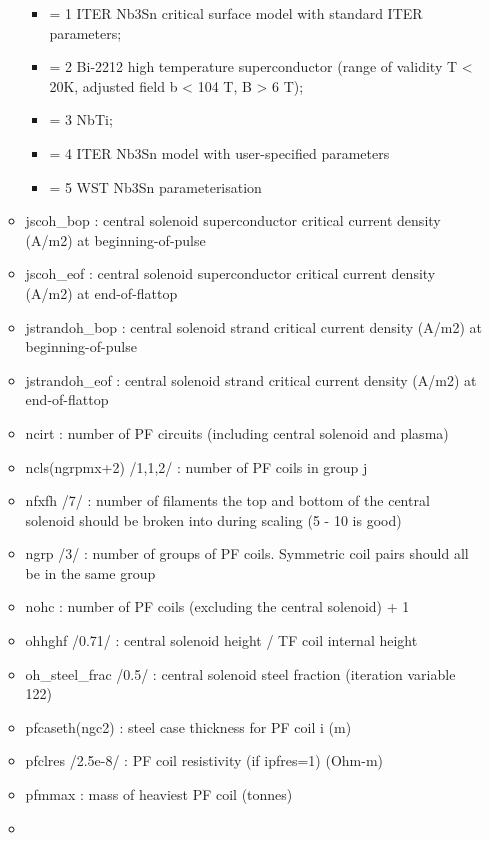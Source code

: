 \documentclass[
]{article}
\providecommand{\tightlist}{%
  \setlength{\itemsep}{0pt}\setlength{\parskip}{0pt}}
\begin{document}
\begin{itemize}
\begin{itemize}
    \begin{itemize}
    \tightlist
    \item
      = 1 ITER Nb3Sn critical surface model with standard ITER
      parameters;
    \item
      = 2 Bi-2212 high temperature superconductor (range of validity T
      \textless{} 20K, adjusted field b \textless{} 104 T, B
      \textgreater{} 6 T);
    \item
      = 3 NbTi;
    \item
      = 4 ITER Nb3Sn model with user-specified parameters
    \item
      = 5 WST Nb3Sn parameterisation
    \end{itemize}
  \item
    jscoh\_bop : central solenoid superconductor critical current
    density (A/m2) at beginning-of-pulse
  \item
    jscoh\_eof : central solenoid superconductor critical current
    density (A/m2) at end-of-flattop
  \item
    jstrandoh\_bop : central solenoid strand critical current density
    (A/m2) at beginning-of-pulse
  \item
    jstrandoh\_eof : central solenoid strand critical current density
    (A/m2) at end-of-flattop
  \item
    ncirt : number of PF circuits (including central solenoid and
    plasma)
  \item
    ncls(ngrpmx+2) /1,1,2/ : number of PF coils in group j
  \item
    nfxfh /7/ : number of filaments the top and bottom of the central
    solenoid should be broken into during scaling (5 - 10 is good)
  \item
    ngrp /3/ : number of groups of PF coils. Symmetric coil pairs should
    all be in the same group
  \item
    nohc : number of PF coils (excluding the central solenoid) + 1
  \item
    ohhghf /0.71/ : central solenoid height / TF coil internal height
  \item
    oh\_steel\_frac /0.5/ : central solenoid steel fraction (iteration
    variable 122)
  \item
    pfcaseth(ngc2) : steel case thickness for PF coil i (m)
  \item
    pfclres /2.5e-8/ : PF coil resistivity (if ipfres=1) (Ohm-m)
  \item
    pfmmax : mass of heaviest PF coil (tonnes)
  \item

\end{itemize}
\end{itemize}
\end{document}
